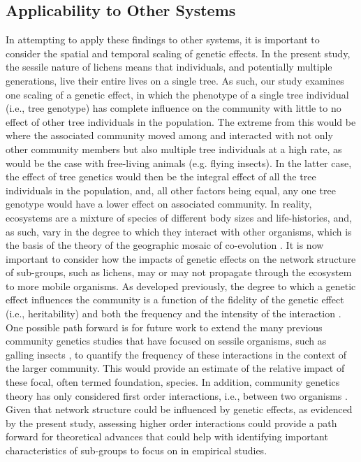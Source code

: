 \documentclass[fleqn,12pt]{olplainarticle}
\begin{document}
\subsection*{Applicability to Other Systems}


In attempting to apply these findings to other systems, it is
important to consider the spatial and temporal scaling of genetic
effects. In the present study, the sessile nature of lichens means
that individuals, and potentially multiple generations, live their
entire lives on a single tree. As such, our study examines one scaling
of a genetic effect, in which the phenotype of a single tree
individual (i.e., tree genotype) has complete influence on the
community with little to no effect of other tree individuals in the
population. The extreme from this would be where the associated
community moved among and interacted with not only other community
members but also multiple tree individuals at a high rate, as would be
the case with free-living animals (e.g. flying insects). In the latter
case, the effect of tree genetics would then be the integral effect of
all the tree individuals in the population, and, all other factors
being equal, any one tree genotype would have a lower effect on
associated community. In reality, ecosystems are a mixture of species
of different body sizes and life-histories, and, as such, vary in the
degree to which they interact with other organisms, which is the basis
of the theory of the geographic mosaic of co-evolution
\cite{Thompson2013, Thompson2013a}. It is now important to consider
how the impacts of genetic effects on the network structure of
sub-groups, such as lichens, may or may not propagate through the
ecosystem to more mobile organisms. As developed previously, the
degree to which a genetic effect influences the community is a
function of the fidelity of the genetic effect (i.e., heritability)
and both the frequency and the intensity of the interaction
\cite{Shuster2006COMMUNITYSTRUCTURE}. One possible path forward is for
future work to extend the many previous community genetics studies
that have focused on sessile organisms, such as galling insects
\cite{Bailey2005ImportanceInteractions, Whitham2006a, Crutsinger2014,
  Smith2011, Keith2017}, to quantify the frequency of these
interactions in the context of the larger community. This would
provide an estimate of the relative impact of these focal, often
termed foundation, species. In addition, community genetics theory has
only considered first order interactions, i.e., between two organisms
\cite{Shuster2006COMMUNITYSTRUCTURE, Whitham2012,
  Whitham2020IntraspecificEvolution}. Given that network structure
could be influenced by genetic effects, as evidenced by the present
study, assessing higher order interactions could provide a path
forward for theoretical advances that could help with identifying
important characteristics of sub-groups to focus on in empirical
studies.
\end{document}
